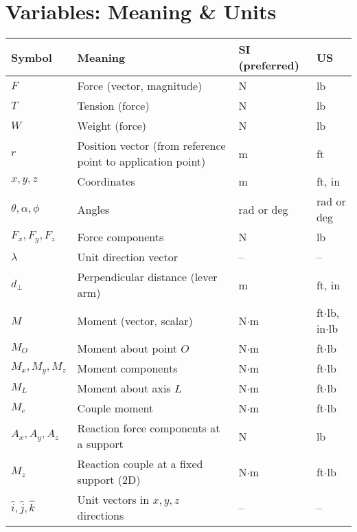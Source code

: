 \documentclass[10pt]{article}
\begin{document}
\section{Variables: Meaning \& Units}
\begin{tabularx}{\linewidth}{l Y l l}
\toprule
\textbf{Symbol} & \textbf{Meaning} & \textbf{SI (preferred)} & \textbf{US} \\
\midrule
    $F$ & Force (vector, magnitude) & N & lb \\
    $T$ & Tension (force) & N & lb \\
    $W$ & Weight (force) & N & lb \\
    $r$ & Position vector (from reference point to application point) & m & ft \\
    $x, y, z$ & Coordinates & m & ft, in \\
    $\theta, \alpha, \phi$ & Angles & rad or deg & rad or deg \\
    $F_x, F_y, F_z$ & Force components & N & lb \\
    $\lambda$ & Unit direction vector & -- & -- \\
    $d_{\perp}$ & Perpendicular distance (lever arm) & m & ft, in \\
    $M$ & Moment (vector, scalar) & N$\cdot$m & ft$\cdot$lb, in$\cdot$lb \\
    $M_O$ & Moment about point $O$ & N$\cdot$m & ft$\cdot$lb \\
    $M_x, M_y, M_z$ & Moment components & N$\cdot$m & ft$\cdot$lb \\
    $M_L$ & Moment about axis $L$ & N$\cdot$m & ft$\cdot$lb \\
    $M_c$ & Couple moment & N$\cdot$m & ft$\cdot$lb \\
    $A_x, A_y, A_z$ & Reaction force components at a support & N & lb \\
    $M_z$ & Reaction couple at a fixed support (2D) & N$\cdot$m & ft$\cdot$lb \\
    $\hat{i}, \hat{j}, \hat{k}$ & Unit vectors in $x,y,z$ directions & -- & -- \\
\bottomrule
\end{tabularx}
\end{document}
